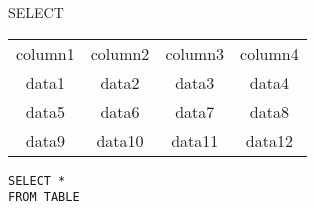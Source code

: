     \begin{frame}{SELECT}
    \begin{table}[h]
    \centering
    \begin{tabular}{|c|c|c|c|}
    \hline
    \rowcolor{cyan!30}\multicolumn{4}{|c|}{Table} \\
    \hline
    \rowcolor{cyan!30}column1 &  column2 & column3 & column4 \\
    \hline
     data1 &  data2 & data3 & data4 \\
     data5 &  data6 & data7 & data8 \\
     data9 &  data10 & data11 & data12 \\
    \hline
    \end{tabular}
    \end{table}
    \vspace{2em} 
    
    \texttt{SELECT * \\FROM TABLE}
    \end{frame}
    
